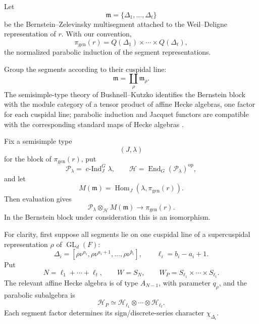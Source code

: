 \documentclass[12pt]{article}
\theoremstyle{definition}
\theoremstyle{remark}
\newcommand{\cInd}{\operatorname{c\text{-}Ind}}
\DeclareMathOperator{\GL}{GL}
\DeclareMathOperator{\Hom}{Hom}
\DeclareMathOperator{\End}{End}
\begin{document}
Let
\[
 \mathfrak m=\{\Delta_1,\ldots,\Delta_t\}
\]
be the Bernstein--Zelevinsky multisegment attached to the Weil--Deligne
representation of \(r\).  With our convention,
\begin{equation}\label{eq:multisegment-parabolic-induction}
 \pi_{\mathrm{gen}}(r)
 =
 Q(\Delta_1)\times\cdots\times Q(\Delta_t),
\end{equation}
the normalized parabolic induction of the segment representations.

Group the segments according to their cuspidal line:
\[
 \mathfrak m=\coprod_{\rho}\mathfrak m_\rho.
\]
The semisimple-type theory of Bushnell--Kutzko identifies the Bernstein block
with the module category of a tensor product of affine Hecke algebras, one
factor for each cuspidal line; parabolic induction and Jacquet functors are
compatible with the corresponding standard maps of Hecke algebras
\cite{BushnellKutzko1999}.

Fix a semisimple type
\[
 (J,\lambda)
\]
for the block of \(\pi_{\mathrm{gen}}(r)\), put
\[
 \mathcal P_\lambda=\cInd_J^G\lambda,
 \qquad
 \mathcal H=\End_G(\mathcal P_\lambda)^{\mathrm{op}},
\]
and let
\[
 M(\mathfrak m)=\Hom_J(\lambda,\pi_{\mathrm{gen}}(r)).
\]
Then evaluation gives
\begin{equation}\label{eq:type-evaluation-multisegment}
 \mathcal P_\lambda\otimes_{\mathcal H}M(\mathfrak m)
 \longrightarrow
 \pi_{\mathrm{gen}}(r).
\end{equation}
In the Bernstein block under consideration this is an isomorphism.

For clarity, first suppose all segments lie on one cuspidal line of a
supercuspidal representation \(\rho\) of \(\GL_d(F)\):
\[
 \Delta_i=
 [\rho\nu^{a_i},\rho\nu^{a_i+1},\ldots,\rho\nu^{b_i}],
 \qquad
 \ell_i=b_i-a_i+1.
\]
Put
\[
 N=\ell_1+\cdots+\ell_t,
 \qquad
 W=S_N,
 \qquad
 W_P=S_{\ell_1}\times\cdots\times S_{\ell_t}.
\]
The relevant affine Hecke algebra is of type \(A_{N-1}\), with parameter
\(q_\rho\), and the parabolic subalgebra is
\[
 \mathcal H_P
 \simeq
 \mathcal H_{\ell_1}\otimes\cdots\otimes\mathcal H_{\ell_t}.
\]
Each segment factor determines its sign/discrete-series character
\(\chi_{\Delta_i}\).  
\end{document}
